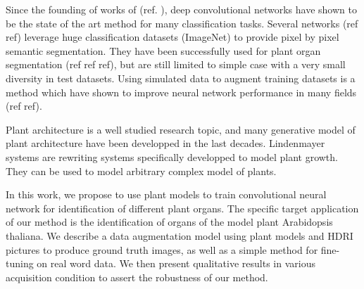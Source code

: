 %

Since the founding of works of (ref. ), deep convolutional networks have shown
to be the state of the art method for many classification tasks. Several
networks (ref ref) leverage huge classification datasets (ImageNet) to provide pixel by
pixel semantic segmentation. They have been successfully used for plant organ
segmentation (ref ref ref), but are still limited to simple case with a very
small diversity in test datasets. Using simulated data to augment training
datasets is a method which have shown to improve neural network performance in
many fields (ref ref).

Plant architecture is a well studied research topic, and many generative model
of plant architecture have been developped in the last decades. Lindenmayer
systems are rewriting systems specifically developped to model plant growth.
They can be used to model arbitrary complex model of plants.

In this work, we propose to use plant models to train convolutional neural network for
identification of different plant organs. The specific target application of
our method is the identification of organs of the model plant Arabidopsis
thaliana. We describe a data augmentation model using plant models and HDRI
pictures to produce ground truth images, as well as a simple method for
fine-tuning on real word data. We then present qualitative results in various
acquisition condition to assert the robustness of our method.
